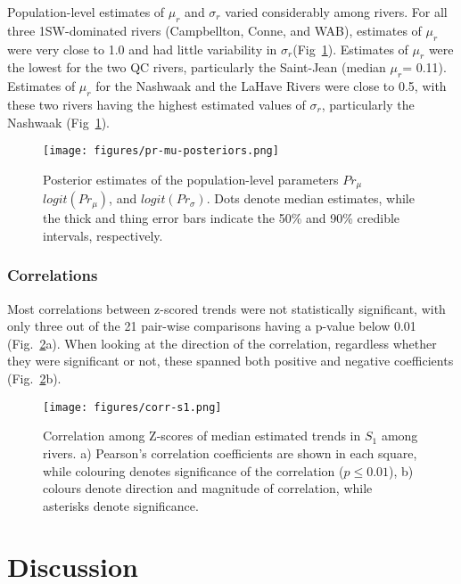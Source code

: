 \documentclass[12pt]{article}
\newcommand{\So}{$S_{1}$\xspace}
\newcommand{\prmu}{$\mu_r$\xspace}
\newcommand{\prsig}{$\sigma_r$\xspace}
\begin{document}
Population-level estimates of \prmu and \prsig varied considerably among rivers. For all
three 1SW-dominated rivers (Campbellton, Conne, and WAB), estimates of \prmu
were very close to 1.0 and had little variability in \prsig (Fig~\ref{fig:prmu-post}).
Estimates of \prmu were the lowest for the two QC rivers, particularly the Saint-Jean (median \prmu = 0.11).
Estimates of \prmu for the Nashwaak and the LaHave Rivers were close to 0.5, with these two rivers having 
the highest estimated values of \prsig, particularly the Nashwaak (Fig~\ref{fig:prmu-post}).

\begin{figure}[htbp] \centering
    \texttt{[image: figures/pr-mu-posteriors.png]}
    \caption{Posterior estimates of the population-level parameters $Pr_{\mu}$
       $logit(Pr_{\mu})$, and $logit(Pr_{\sigma})$. Dots denote median estimates, while the thick and thing error bars indicate
       the 50\% and 90\% credible intervals, respectively.} 
   \label{fig:prmu-post} 
\end{figure}

\subsubsection*{Correlations}

Most correlations between z-scored trends were not statistically significant, with only 
three out of the 21 pair-wise comparisons having a p-value below 0.01 (Fig.~\ref{fig:s1-corr}a).
When looking at the direction of the correlation, regardless whether they were
significant or not, these spanned both positive and negative coefficients
(Fig.~\ref{fig:s1-corr}b).

\begin{figure}[htbp] \centering
    \texttt{[image: figures/corr-s1.png]} \caption{
        Correlation among Z-scores of median estimated trends in \So among
        rivers. a) Pearson's correlation coefficients are shown in each square,
        while colouring denotes significance of the correlation ($p \leq 0.01$), b)
        colours denote direction and magnitude of correlation, while asterisks denote significance.}
\label{fig:s1-corr} 
\end{figure}

\section*{Discussion} 

\end{document}
